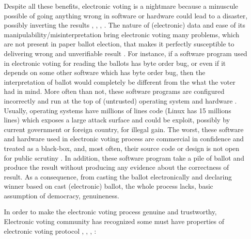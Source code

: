    
  Despite all these benefits, electronic voting is a nightmare because a minuscule possible of 
  going anything wrong in software or hardware could lead to a disaster,   possibly 
  inverting the results \citep{TSwiss},
  \citep{10.1007/978-3-319-22270-7_3}, \citep{ARANHA2019335},
  \citep{Feldman:2007:SAD:1323111.1323113}.  The nature of (electronic) data and ease of 
  its manipulability/misinterpretation bring electronic voting many problems, which are not present in paper ballot election, that 
  makes it perfectly susceptible to delivering wrong and unverifiable result \citep{Wolchok:2010:SAI:1866307.1866309}.
  For instance,  if a software program used in electronic voting 
  for reading the ballots has byte order bug, or even if it depends on some other software which has byte order bug, then the interpretation of 
  ballot would completely be different from the what the voter had in mind.
  More often than not, these software programs are configured incorrectly and run at the top of (untrusted) operating 
  system and hardware \citep{1301313}. Usually, operating systems have millions of lines code (Linux has 15 millions lines) which exposes
  a large attack surface and could be exploit, possibly by current government or foreign country, for illegal gain. 
  The worst, these software and hardware used in electronic voting process are commercial in 
  confidence and treated as a black-box, and, most often, their source code or design is not open 
  for public scrutiny \citep{AEC:2013:LMM}. In addition, these software program 
  take a pile of ballot and produce the result without producing any evidence about the correctness of result.  As a consequence,
  from casting the ballot electronically and declaring winner based on cast (electronic) ballot, the whole process lacks, basic assumption 
  of democracy,  genuineness. 
  
  In order to make the electronic voting process genuine and trustworthy, Electronic voting 
  community has recognized some must have properties of electronic voting protocol
  \citep{5958051}, 
   \citep{Benaloh:1994:RSE:195058.195407},  \citep{Delaune:2010:VPT}, \citep{Bernhard:2017:PES}:
  

